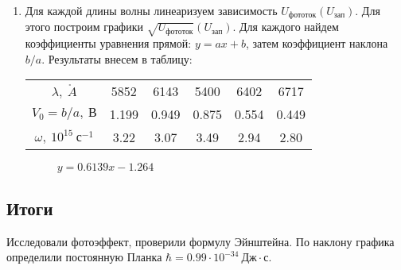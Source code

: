 \documentclass{lab}
\renewcommand{\AA}{\ensuremath{\mathring{A}}}
\begin{document}
\begin{enumerate}
\newpage

\item
Для каждой длины волны линеаризуем зависимость $ U_{фототок}(U_{зап}) $. Для этого построим графики $ \sqrt{U_{фототок}}(U_{зап}) $. Для каждого найдем коэффициенты уравнения прямой: $ y = ax + b $, затем коэффициент наклона $ b/a $. Результаты внесем в таблицу:

\begin{table}[H]
	\centering
	\begin{tabular}{|c|ccccc|}
		\hline
		$ \lambda,~\AA{} $         & 5852 & 6143 & 5400 & 6402 & 6717 \\
		$ V_0 = b/a,~В $           & 1.199 & 0.949 & 0.875 & 0.554 & 0.449 \\
		$ \omega,~10^{15}~с^{-1} $ & 3.22 & 3.07 & 3.49 & 2.94 & 2.80 \\
		\hline
	\end{tabular}
	\label{tab3}
\end{table}

\begin{figure}[H]
	\centering
	\caption{$ y = 0.6139x - 1.264 $}
	\label{graph2}
\end{figure}






\end{enumerate}

\subsection*{Итоги}
Исследовали фотоэффект, проверили формулу Эйнштейна.
По наклону графика определили постоянную Планка $ \hbar = 0.99 \cdot 10^{-34}~Дж \cdot с $.
\end{document}
